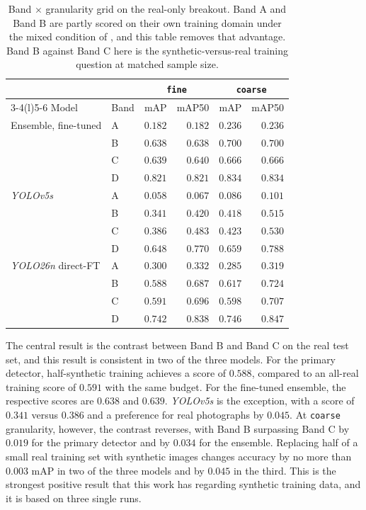 \begin{table}[htbp]
\centering
\caption[Band by granularity grid on the real test set]{Band $\times$ granularity grid on the real-only breakout. Band A and Band B are partly scored on their own training domain under the mixed condition of , and this table removes that advantage. Band B against Band C here is the synthetic-versus-real training question at matched sample size.}
\label{tab:band-grid-real}
\small
\begin{tabular}{@{}llrrrr@{}}
\toprule
 & & \multicolumn{2}{c}{\texttt{fine}} & \multicolumn{2}{c}{\texttt{coarse}} \\
\cmidrule(l){3-4}\cmidrule(l){5-6}
Model & Band & mAP & mAP50 & mAP & mAP50 \\
\midrule
Ensemble, fine-tuned & A & $0.182$ & $0.182$ & $0.236$ & $0.236$ \\
 & B & $0.638$ & $0.638$ & $0.700$ & $0.700$ \\
 & C & $0.639$ & $0.640$ & $0.666$ & $0.666$ \\
 & D & $0.821$ & $0.821$ & $0.834$ & $0.834$ \\
\midrule
\textit{YOLOv5s} & A & $0.058$ & $0.067$ & $0.086$ & $0.101$ \\
 & B & $0.341$ & $0.420$ & $0.418$ & $0.515$ \\
 & C & $0.386$ & $0.483$ & $0.423$ & $0.530$ \\
 & D & $0.648$ & $0.770$ & $0.659$ & $0.788$ \\
\midrule
\textit{YOLO26n} direct-FT & A & $0.300$ & $0.332$ & $0.285$ & $0.319$ \\
 & B & $0.588$ & $0.687$ & $0.617$ & $0.724$ \\
 & C & $0.591$ & $0.696$ & $0.598$ & $0.707$ \\
 & D & $0.742$ & $0.838$ & $0.746$ & $0.847$ \\
\bottomrule
\end{tabular}
\end{table}

The central result is the contrast between Band B and Band C on the real test set, and this result is consistent in two of the three models. For the primary detector, half-synthetic training achieves a score of $0.588$, compared to an all-real training score of $0.591$ with the same budget. For the fine-tuned ensemble, the respective scores are $0.638$ and $0.639$. \textit{YOLOv5s} is the exception, with a score of $0.341$ versus $0.386$ and a preference for real photographs by $0.045$. At \texttt{coarse} granularity, however, the contrast reverses, with Band B surpassing Band C by $0.019$ for the primary detector and by $0.034$ for the ensemble. Replacing half of a small real training set with synthetic images changes accuracy by no more than $0.003$ mAP in two of the three models and by $0.045$ in the third. This is the strongest positive result that this work has regarding synthetic training data, and it is based on three single runs.

